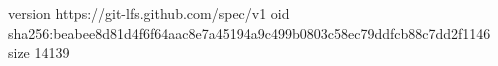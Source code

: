 version https://git-lfs.github.com/spec/v1
oid sha256:beabee8d81d4f6f64aac8e7a45194a9c499b0803c58ec79ddfcb88c7dd2f1146
size 14139
